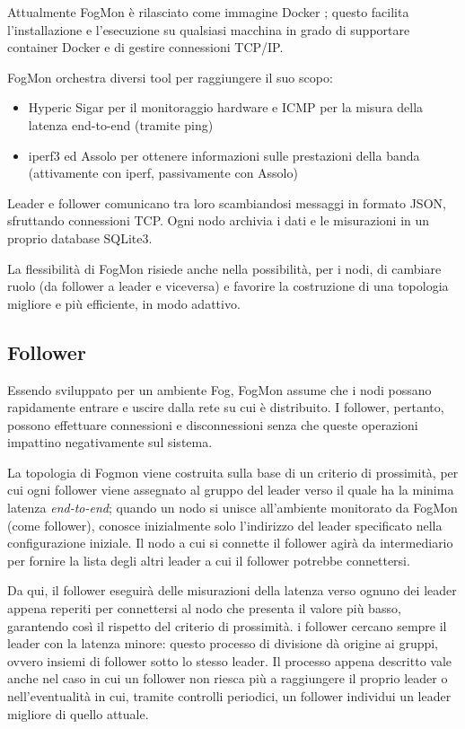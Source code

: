     
    Attualmente FogMon è rilasciato come immagine Docker \cite{docker}; questo facilita l’installazione e l’esecuzione su qualsiasi macchina in grado di supportare container Docker e di gestire connessioni TCP/IP.
    
    FogMon orchestra diversi tool per raggiungere il suo scopo:
    \begin {itemize}
        \item Hyperic Sigar \cite{sigar} per il monitoraggio hardware e ICMP per la misura della latenza end-to-end (tramite ping)
        \item iperf3 \cite{iperf} ed Assolo \cite{assolo} per ottenere informazioni sulle prestazioni della banda (attivamente con iperf, passivamente con Assolo)
    \end{itemize}
    Leader e follower comunicano tra loro scambiandosi messaggi in formato JSON, sfruttando connessioni TCP. Ogni nodo archivia i dati e le misurazioni in un proprio database SQLite3.
    
    La flessibilità di FogMon risiede anche nella possibilità, per i nodi, di cambiare ruolo (da follower a leader e viceversa) e favorire la costruzione di una topologia migliore e più efficiente, in modo adattivo.
        \subsection{Follower}
        Essendo sviluppato per un ambiente Fog, FogMon assume che i nodi possano rapidamente entrare e uscire dalla rete su cui è distribuito. I follower, pertanto, possono effettuare connessioni e disconnessioni senza che queste operazioni impattino negativamente sul sistema.
        
        
        La topologia di Fogmon viene costruita sulla base di un criterio di prossimità, per cui ogni follower viene assegnato al gruppo del leader verso il quale ha la minima latenza \textit{end-to-end}; quando un nodo si unisce all’ambiente monitorato da FogMon (come follower), conosce inizialmente solo l’indirizzo del leader specificato nella configurazione iniziale. Il nodo a cui si connette il follower agirà da intermediario per fornire la lista degli altri leader a cui il follower potrebbe connettersi.
        
        
        Da qui, il follower eseguirà delle misurazioni della latenza verso ognuno dei leader appena reperiti per connettersi al nodo che presenta il valore più basso, garantendo così il rispetto del criterio di prossimità. i follower cercano sempre il leader con la latenza minore: questo processo di divisione dà origine ai gruppi, ovvero insiemi di follower sotto lo stesso leader. Il processo appena descritto vale anche nel caso in cui un follower non riesca più a raggiungere il proprio leader o nell’eventualità in cui, tramite controlli periodici, un follower individui un leader migliore di quello attuale. 
        
